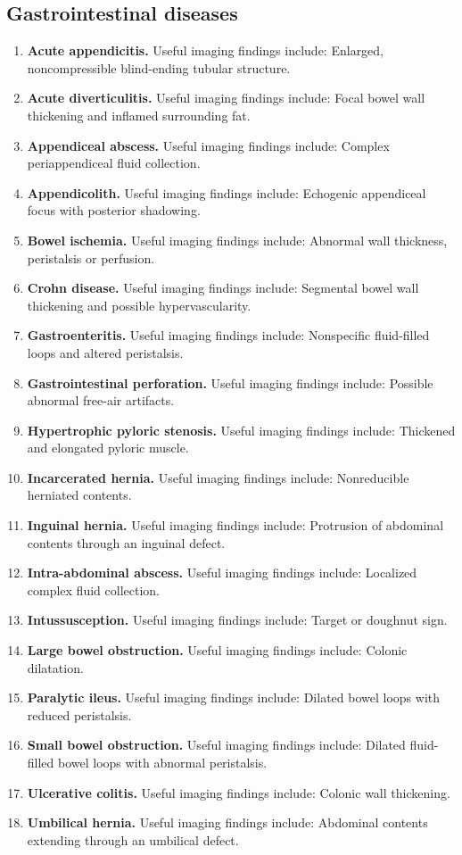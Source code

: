 \subsection{Gastrointestinal diseases}
\begin{enumerate}[leftmargin=*,itemsep=0.45em,topsep=0.4em]
\item \textbf{Acute appendicitis.} Useful imaging findings include: Enlarged, noncompressible blind-ending tubular structure.
\item \textbf{Acute diverticulitis.} Useful imaging findings include: Focal bowel wall thickening and inflamed surrounding fat.
\item \textbf{Appendiceal abscess.} Useful imaging findings include: Complex periappendiceal fluid collection.
\item \textbf{Appendicolith.} Useful imaging findings include: Echogenic appendiceal focus with posterior shadowing.
\item \textbf{Bowel ischemia.} Useful imaging findings include: Abnormal wall thickness, peristalsis or perfusion.
\item \textbf{Crohn disease.} Useful imaging findings include: Segmental bowel wall thickening and possible hypervascularity.
\item \textbf{Gastroenteritis.} Useful imaging findings include: Nonspecific fluid-filled loops and altered peristalsis.
\item \textbf{Gastrointestinal perforation.} Useful imaging findings include: Possible abnormal free-air artifacts.
\item \textbf{Hypertrophic pyloric stenosis.} Useful imaging findings include: Thickened and elongated pyloric muscle.
\item \textbf{Incarcerated hernia.} Useful imaging findings include: Nonreducible herniated contents.
\item \textbf{Inguinal hernia.} Useful imaging findings include: Protrusion of abdominal contents through an inguinal defect.
\item \textbf{Intra-abdominal abscess.} Useful imaging findings include: Localized complex fluid collection.
\item \textbf{Intussusception.} Useful imaging findings include: Target or doughnut sign.
\item \textbf{Large bowel obstruction.} Useful imaging findings include: Colonic dilatation.
\item \textbf{Paralytic ileus.} Useful imaging findings include: Dilated bowel loops with reduced peristalsis.
\item \textbf{Small bowel obstruction.} Useful imaging findings include: Dilated fluid-filled bowel loops with abnormal peristalsis.
\item \textbf{Ulcerative colitis.} Useful imaging findings include: Colonic wall thickening.
\item \textbf{Umbilical hernia.} Useful imaging findings include: Abdominal contents extending through an umbilical defect.
\end{enumerate}

